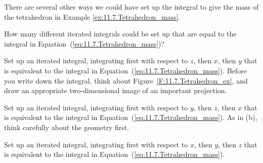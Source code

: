 \begin{activity} \label{A:11.7.4} There are several other ways we could have set up the integral to give the mass of the tetrahedron in Example \ref{ex:11.7.Tetrahedron_mass}.
	\ba
	\item How many different iterated integrals could be set up that are equal to the integral in Equation~(\ref{eq:11.7.Tetrahedron_mass})?



	\item Set up an iterated integral, integrating first with respect to $z$, then $x$, then $y$ that is equivalent to the integral in Equation~(\ref{eq:11.7.Tetrahedron_mass}).  Before you write down the integral, think about Figure~\ref{F:11.7.Tetrahedron_ex}, and draw an appropriate two-dimensional image of an important projection.

	\item Set up an iterated integral, integrating first with respect to $y$, then $z$, then $x$ that is equivalent to the integral in Equation~(\ref{eq:11.7.Tetrahedron_mass}).  As in (b), think carefully about the geometry first.

	\item Set up an iterated integral, integrating first with respect to $x$, then $y$, then $z$ that is equivalent to the integral in Equation~(\ref{eq:11.7.Tetrahedron_mass}).



	\ea

\end{activity}
\begin{smallhint}

\end{smallhint}
\begin{bighint}

\end{bighint}
